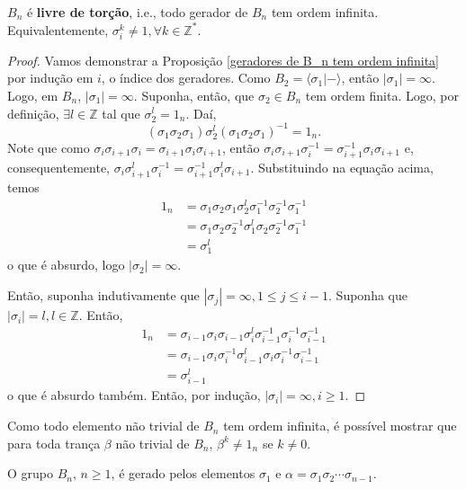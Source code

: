	\begin{prop}
		\label{geradores de B_n tem ordem infinita}
		$B_n$ é \textbf{livre de torção}, i.e., todo gerador de $B_n$ tem ordem infinita. 
		Equivalentemente, $\sigma_i^k \neq 1, \forall k\in\mathbb{Z}^{\ast}$.
	\end{prop}
	\begin{proof}
		Vamos demonstrar a Proposição \ref{geradores de B_n tem ordem infinita} por indução em $i$, 
		o índice dos geradores.	Como $B_2 = \langle \sigma_1 | - \rangle$, então $|\sigma_1| = \infty$. 
		Logo, em $B_n$, $|\sigma_1| = \infty$. Suponha, então, que $\sigma_2\in B_n$ tem ordem finita. 
		Logo, por definição, $\exists l\in\mathbb{Z}$ tal que $\sigma_2^l = 1_n$. Daí, 
		\begin{equation*}
		    (\sigma_1\sigma_2\sigma_1)\sigma_2^l(\sigma_1\sigma_2\sigma_1)^{-1} = 1_n.
		\end{equation*}
		Note que como $\sigma_i\sigma_{i+1}\sigma_i = \sigma_{i+1}\sigma_i\sigma_{i+1}$, 
		então $\sigma_i\sigma_{i+1}\sigma_i^{-1} = \sigma_{i+1}^{-1}\sigma_i\sigma_{i+1}$ e, 
		consequentemente, $\sigma_i\sigma_{i+1}^l\sigma_i^{-1} = \sigma_{i+1}^{-1}\sigma_i^l\sigma_{i+1}$.
		Substituindo na equação acima, temos
		\begin{align*}
    		1_n &= \sigma_1\sigma_2\sigma_1\sigma_2^l\sigma_1^{-1}\sigma_2^{-1}\sigma_1^{-1} \\
    		&= \sigma_1\sigma_2\sigma_2^{-1}\sigma_1^l\sigma_2\sigma_2^{-1}\sigma_1^{-1} \\
    		&= \sigma_1^l
		\end{align*}
		o que é absurdo, logo $|\sigma_2| = \infty$.
		
		\par\vspace{0.3cm} Então, suponha indutivamente que $|\sigma_j| = \infty, 1\leq j\leq i-1$. 
		Suponha que $|\sigma_i| = l, l\in\mathbb{Z}$. Então, 
		\begin{align*}
    		1_n 
    		&= \sigma_{i-1}\sigma_i\sigma_{i-1}\sigma_i^l\sigma_{i-1}^{-1}\sigma_i^{-1}\sigma_{i-1}^{-1} \\
    		&= \sigma_{i-1}\sigma_i\sigma_i^{-1}\sigma_{i-1}^l\sigma_i\sigma_i^{-1}\sigma_{i-1}^{-1} \\
    		&= \sigma_{i-1}^l
		\end{align*}
		o que é absurdo também. Então, por indução, $|\sigma_i| = \infty, i\geq 1$. 
	\end{proof}
	\begin{remark}
		Como todo elemento não trivial de $B_n$ tem ordem infinita, é possível mostrar que para 
		toda trança $\beta$ não trivial de $B_n$, $\beta^k\neq 1_n$ se $k\neq 0$.
	\end{remark}
	\begin{prop}
	\label{sigma1 e alfa geram B_n}
		O grupo $B_n$, $n\geq 1$, é gerado pelos elementos $\sigma_1$ e 
		$\alpha = \sigma_1\sigma_2\cdots\sigma_{n-1}$.
	\end{prop}
	
